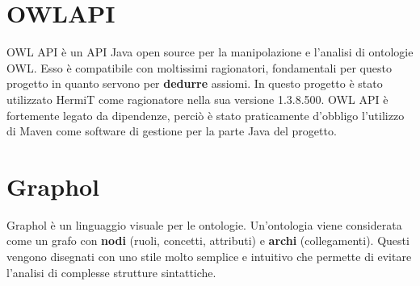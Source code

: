 \documentclass[Lau,binding=0.6cm]{sapthesis}
\begin{document}
\section{OWLAPI}
OWL API è un API Java open source per la manipolazione e l'analisi di ontologie OWL. Esso è compatibile con moltissimi ragionatori, fondamentali per questo progetto in quanto servono per \textbf{dedurre} assiomi. In questo progetto è stato utilizzato HermiT come ragionatore nella sua versione 1.3.8.500. OWL API è fortemente legato da dipendenze, perciò è stato praticamente d'obbligo l'utilizzo di Maven come software di gestione per la parte Java del progetto. 

\section{Graphol}
Graphol è un linguaggio visuale per le ontologie. Un'ontologia viene considerata come un grafo con \textbf{nodi} (ruoli, concetti, attributi) e \textbf{archi} (collegamenti). Questi vengono disegnati con uno stile molto semplice e intuitivo che permette di evitare l'analisi di complesse strutture sintattiche.
\end{document}
